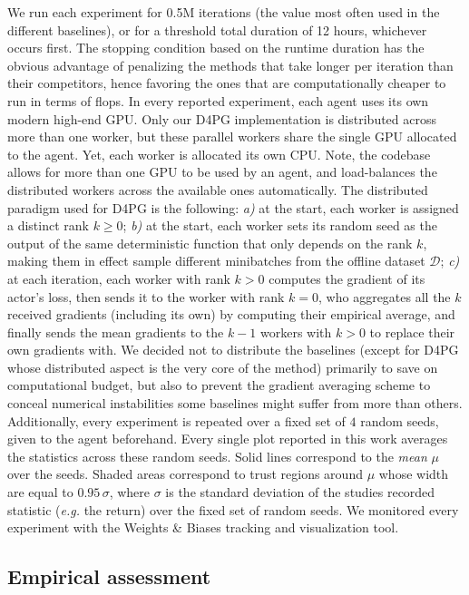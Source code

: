 We run each experiment for 0.5M iterations (the value most often used in the different baselines),
or for a threshold total duration of 12 hours, whichever occurs first.
The stopping condition based on the runtime duration has the obvious advantage of penalizing
the methods that take longer per iteration than their competitors, hence
favoring the ones that are computationally cheaper to run in terms of flops.
In every reported experiment, each agent uses its own modern high-end GPU.
Only our D4PG implementation is distributed across more than one worker, but these parallel workers share the
single GPU allocated to the agent. Yet, each worker is allocated its own CPU.
Note, the codebase allows for more than one GPU to be used by an agent, and load-balances
the distributed workers across the available ones automatically.
The distributed paradigm used for D4PG is the following:
\textit{a)} at the start, each worker is assigned a distinct rank $k \geq 0$;
\textit{b)} at the start, each worker sets its random seed as the output of the same deterministic function
that only depends on the rank $k$, making them in effect sample different minibatches
from the offline dataset $\mathcal{D}$;
\textit{c)} at each iteration, each worker with rank $k>0$ computes the gradient of its actor's loss,
then sends it to the worker with rank $k=0$, who aggregates all the $k$ received gradients
(including its own) by computing their empirical average, and finally sends the mean gradients to the
$k-1$ workers with $k>0$ to replace their own gradients with. We decided not to distribute the baselines
(except for D4PG whose distributed aspect is the very core of the method)
primarily to save on computational budget, but also to prevent the gradient averaging scheme to
conceal numerical instabilities some baselines might suffer from more than others.
Additionally, every experiment is repeated over a fixed set of $4$ random seeds, given to the agent beforehand.
Every single plot reported in this work averages the statistics across these random seeds.
Solid lines correspond to the \emph{mean} $\mu$ over the seeds.
Shaded areas correspond to trust regions around $\mu$ whose width are equal to $0.95 \, \sigma$,
where $\sigma$ is the standard deviation of the studies recorded statistic
(\textit{e.g.} the return) over the fixed set of random seeds.
We monitored every experiment with the Weights \& Biases \cite{Biewald2020-wb} tracking and visualization tool.

\subsection{Empirical assessment}
\label{experimentalassessment}

